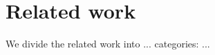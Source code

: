\chapter{Related work}
\label{ch:related_work}
We divide the related work into ... categories:  ...

